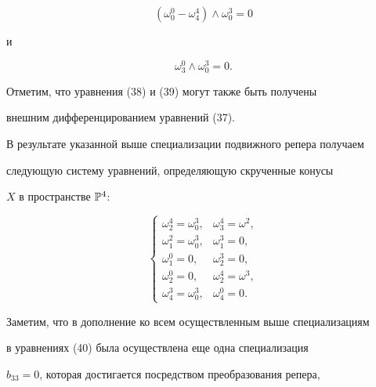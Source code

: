 \begin{equation}\label{eq:46}


(\omega_0^0 - \omega_4^4) \wedge \omega_0^3 = 0


\end{equation}


и


\begin{equation}\label{eq:47}


\omega_3^0 \wedge \omega_0^3 = 0.


\end{equation}


Отметим, что уравнения  (38) и (39) могут также быть получены


внешним дифференцированием уравнений (37).





В результате указанной выше специализации подвижного репера получаем


следующую систему уравнений, определяющую скрученные конусы


$X$ в пространстве $\Bbb P^4$:


\begin{equation}\label{eq:48}


\left\{


\begin{array}{ll}


\omega_2^4 = \omega_0^3, & \omega_3^4 = \omega^2, \\[2mm]


\omega_1^2 = \omega_0^3, & \omega_1^3 = 0, \\[2mm]


\omega_1^0 = 0,        & \omega_2^3 = 0, \\[2mm]


\omega_2^0 = 0,         & \omega_2^4 = \omega^3, \\[2mm]


\omega_4^3 = \omega_0^3,  & \omega_4^0 = 0.


\end{array}


\right.


\end{equation}


Заметим, что в дополнение ко всем осуществленным выше специализациям


в уравнениях (40) была осуществлена еще одна специализация


$b_{33} = 0$, которая достигается посредством преобразования репера,



